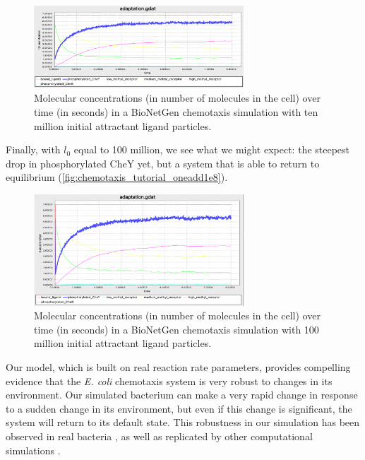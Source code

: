 \begin{figure}[h]
\centering
\mySfFamily
\includegraphics[width = 0.7\textwidth]{../images/chemotaxis_tutorial_oneadd1e7.png}
\caption{Molecular concentrations (in number of molecules in the cell) over time (in seconds) in a BioNetGen chemotaxis simulation with ten million initial attractant ligand particles.}
\label{fig:chemotaxis_tutorial_oneadd1e7}
\end{figure}

Finally, with $l_0$ equal to 100 million, we see what we might expect: the steepest drop in phosphorylated CheY yet, but a system that is able to return to equilibrium (\autoref{fig:chemotaxis_tutorial_oneadd1e8}).

\begin{figure}[h]
\centering
\mySfFamily
\includegraphics[width = 0.7\textwidth]{../images/chemotaxis_tutorial_oneadd1e8.png}
\caption{Molecular concentrations (in number of molecules in the cell) over time (in seconds) in a BioNetGen chemotaxis simulation with 100 million initial attractant ligand particles.}
\label{fig:chemotaxis_tutorial_oneadd1e8}
\end{figure}

Our model, which is built on real reaction rate parameters, provides compelling evidence that the \textit{E. coli} chemotaxis system is very robust to changes in its environment. Our simulated bacterium can make a very rapid change in response to a sudden change in its environment, but even if this change is significant, the system will return to its default state. This robustness in our simulation has been observed in real bacteria \citep{Shimizu_2005, Krembel_2015}, as well as replicated by other computational simulations \citep{Bray_1993}.

